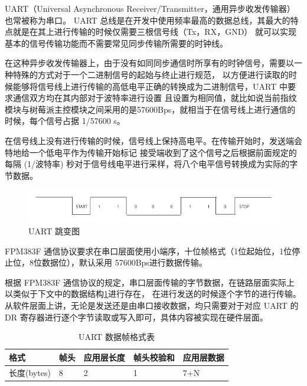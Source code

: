     UART（Universal Asynchronous Receiver/Transmitter，通用异步收发传输器）也常被称为串口。
    UART 总线是在开发中使用频率最高的数据总线，其最大的特点就是在其上进行传输的时候仅需要三根信号线（Tx，RX，GND）
    就可以实现基本的信号传输功能而不需要常见同步传输所需要的时钟线。

    在这种异步收发传输器上，由于没有如同同步通信时所享有的时钟信号，需要以一种特殊的方式对于一个二进制信号的起始与终止进行规范，
    以方便进行读取的时候能够将信号线上进行传输的高低电平正确的转换成为二进制信号，UART 中要求通信双方均在其内部对于波特率进行设置
    且设置为相同值，就比如说当前指纹模块与树莓派主控模块之间采用的是57600Bps，就相当于在信号线上进行通信的时候，每个信号占据 1/57600 s。

    在信号线上没有进行传输的时候，信号线上保持高电平。在传输开始时，发送端会特地给一个低电平作为传输开始标记
    接受端收到了这个信号之后根据前面规定的每隔 (1/波特率) 秒对于信号线电平进行采样，将八个电平信号转换成为实际的字节数据。

    \begin{figure}[ht]
        \centering
        \includegraphics[scale=0.4]{imgs/UART跳变图.png}
        \caption{UART 跳变图}    \label{fig::uart}
    \end{figure}

    FPM383F 通信协议要求在串口层面使用小端序，十位帧格式（1位起始位，1位停止位，8位数据位），默认采用 57600Bps进行数据传输。
    \cite{noauthor_fpm383c_nodate}

    根据 FPM383F 通信协议的规定，串口层面传输的字节数据，在链路层面实际上以类似于下文中的数据结构\ref{FPM383F::UARTdataFrame}进行存在，
    在进行发送的时候逐个字节的进行传输。\cite{noauthor_fpm383c_nodate}
    从软件层面上讲，无论是发送还是由串口接收数据，均只需要对于对应 UART 的 DR 寄存器进行逐个字节读取或写入即可，具体内容被实现在硬件层面。
    
    \begin{table}[ht]
        \centering
        \begin{tabular}{|l|l|l|l|l|}
        \hline
        格式        & 帧头 & 应用层长度 & 帧头校验和 & 应用层数据 \\ \hline
        长度(bytes) & 8  & 2     & 1     & 7+N   \\ \hline
        \end{tabular}
        \caption{UART 数据帧格式表} \label{FPM383F::UARTdataFrame}
    \end{table}
    
